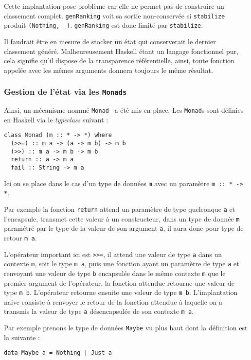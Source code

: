 \documentclass{llncs}
\begin{document}
Cette implantation pose problème car elle ne permet pas de construire un classement
complet. \lstinline{genRanking} voit sa sortie non-conservée si \lstinline{stabilize}
produit \lstinline{(Nothing, _)}.
\lstinline{genRanking} est donc limité par \lstinline{stabilize}.

Il faudrait être en mesure de stocker un état qui conserverait le dernier classement
généré.
Malheureusement Haskell étant un langage fonctionnel pur, cela signifie qu'il dispose
de la transparence référentielle, ainsi, toute fonction appelée avec les mêmes arguments
donnera toujours le même résultat.

\subsubsection{Gestion de l'état via les \lstinline{Monads}}
Ainsi, un mécanisme nommé \lstinline{Monad}~\cite{Wadler90} a été mis en place.
Les \lstinline{Monad}s sont définies en Haskell via le \emph{typeclass} suivant :
\begin{lstlisting}
class Monad (m :: * -> *) where
  (>>=) :: m a -> (a -> m b) -> m b
  (>>) :: m a -> m b -> m b
  return :: a -> m a
  fail :: String -> m a
\end{lstlisting}

Ici on se place dans le cas d'un type de données \lstinline{m} avec un paramètre
\lstinline{m :: * -> *}.

Par exemple la fonction \lstinline{return} attend un paramètre de type quelconque
\lstinline{a} et l'encapsule, transmet cette valeur à un constructeur, dans
un type de donnée \lstinline{m} paramétré par le type de la valeur de son argument
\lstinline{a}, il aura donc pour type de retour \lstinline{m a}.

L'opérateur important ici est \lstinline{>>=}, il attend une valeur de type
\lstinline{a} dans un contexte \lstinline{m}, soit
le type \lstinline{m a}, puis une fonction ayant un paramètre de type \lstinline{a}
et renvoyant une valeur de type \lstinline{b} encapsulée dans le même contexte \lstinline{m}
que le premier argument de l'opérateur, la fonction attendue retourne
une valeur de type \lstinline{m b}. L'opérateur retourne ensuite une valeur de
type \lstinline{m b}.
L'implantation naive consiste à renvoyer le retour de la fonction attendue à
laquelle on a transmis la valeur de type \lstinline{a} désencapsulée de son contexte
\lstinline{m a}.

Par exemple prenons le type de données \lstinline{Maybe} vu plus haut dont la définition
est la suivante :
\begin{lstlisting}
data Maybe a = Nothing | Just a
\end{lstlisting}
\end{document}
